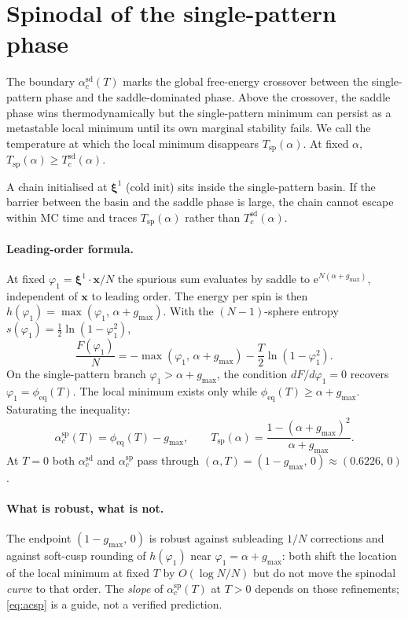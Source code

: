 \documentclass[11pt]{article}
\newcommand{\bxi}{\boldsymbol{\xi}}
\newcommand{\bx}{\bm{x}}
\newcommand{\e}{{\mathrm{e}}}
\newcommand{\phieq}{\phi_{\mathrm{eq}}}
\newcommand{\acSd}{\alpha_c^{\mathrm{sd}}}
\newcommand{\acSp}{\alpha_c^{\mathrm{sp}}}
\newcommand{\Tsp}{T_{\mathrm{sp}}}
\begin{document}
\section{Spinodal of the single-pattern phase}
\label{sec:spinodal}

The boundary $\acSd(T)$ marks the global free-energy crossover between
the single-pattern phase and the saddle-dominated phase.  Above the
crossover, the saddle phase wins thermodynamically but the
single-pattern minimum can persist as a metastable local minimum until
its own marginal stability fails.  We call the temperature at which the
local minimum disappears $\Tsp(\alpha)$.  At fixed $\alpha$,
$\Tsp(\alpha) \geq T_c^{\mathrm{sd}}(\alpha)$.

A chain initialised at $\bxi^1$ (cold init) sits inside the single-pattern
basin.  If the barrier between the basin and the saddle phase is large,
the chain cannot escape within MC time and traces $\Tsp(\alpha)$ rather
than $T_c^{\mathrm{sd}}(\alpha)$.

\paragraph{Leading-order formula.}
At fixed $\varphi_1 = \bxi^1 \!\cdot\! \bx / N$ the spurious sum
evaluates by saddle to $\e^{N(\alpha + g_{\max})}$, independent of $\bx$
to leading order.  The energy per spin is then
$h(\varphi_1) = \max(\varphi_1,\,\alpha + g_{\max})$.  With the
$(N-1)$-sphere entropy $s(\varphi_1) = \tfrac12 \ln(1 - \varphi_1^2)$,
\begin{equation}
\frac{F(\varphi_1)}{N}
   = -\max(\varphi_1,\,\alpha + g_{\max})
     - \frac{T}{2} \ln(1 - \varphi_1^2).
\label{eq:F-leading}
\end{equation}
On the single-pattern branch $\varphi_1 > \alpha + g_{\max}$, the
condition $dF / d\varphi_1 = 0$ recovers
$\varphi_1 = \phieq(T)$.  The local minimum exists only while
$\phieq(T) \geq \alpha + g_{\max}$.  Saturating the inequality:
\begin{equation}
\boxed{\;
\acSp(T) = \phieq(T) - g_{\max},
\qquad
\Tsp(\alpha) = \frac{1 - (\alpha + g_{\max})^2}{\alpha + g_{\max}}.
\;}
\label{eq:acsp}
\end{equation}
At $T = 0$ both $\acSd$ and $\acSp$ pass through
$(\alpha, T) = (1 - g_{\max},\,0) \approx (0.6226,\,0)$.

\paragraph{What is robust, what is not.}
The endpoint $(1 - g_{\max},\,0)$ is robust against subleading $1/N$
corrections and against soft-cusp rounding of $h(\varphi_1)$ near
$\varphi_1 = \alpha + g_{\max}$: both shift the location of the local
minimum at fixed $T$ by $O(\log N / N)$ but do not move the spinodal
\emph{curve} to that order.  The \emph{slope} of $\acSp(T)$ at $T > 0$
depends on those refinements; \eqref{eq:acsp} is a guide, not a
verified prediction.
\end{document}
